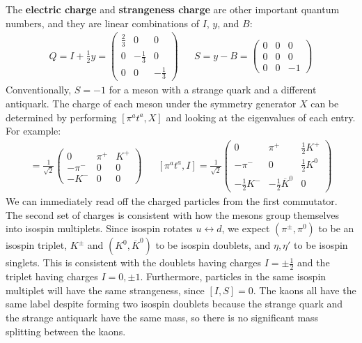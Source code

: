 \documentclass[11pt, oneside]{article}   	%
\theoremstyle{definition}
\numberwithin{equation}{subsection}		%
\begin{document}
The \textbf{electric charge} and \textbf{strangeness charge} are other important quantum numbers, and they are linear combinations 
of $I$, $y$, and $B$:
\begin{align}
	Q = I + \frac{1}{2} y = \begin{pmatrix} \frac{2}{3} & 0 & 0 \\ 0 & -\frac{1}{3} & 0 \\ 0 & 0 & -\frac{1}{3} \end{pmatrix} &&
	S = y - B = \begin{pmatrix} 0 & 0 & 0 \\ 0 & 0 & 0 \\ 0 & 0 & -1 \end{pmatrix}
\end{align}
Conventionally, $S = -1$ for a meson with a strange quark and a different antiquark. The charge of each meson under the symmetry 
generator $X$ can be determined by performing $[\pi^a t^a, X]$ and looking at the eigenvalues of each entry. For example:
\begin{align}
	[\pi^a t^a, Q] = \frac{1}{\sqrt 2} \begin{pmatrix} 0 & \pi^+ & K^+ \\ -\pi^- & 0 & 0 \\ -K^- & 0 & 0 \end{pmatrix} && 
	[\pi^a t^a, I] = \frac{1}{\sqrt 2} \begin{pmatrix} 0 & \pi^+ & \frac{1}{2} K^+ \\ -\pi^- & 0 & \frac{1}{2} K^0 \\ -\frac{1}{2} K^- & -\frac{1}{2} \overline{K}^0 & 0 \end{pmatrix}
\end{align}
We can immediately read off the charged particles from the first commutator. The second set of charges is consistent with how the mesons 
group themselves into isospin multiplets. Since isospin rotates $u\leftrightarrow d$, we expect $(\pi^\pm, \pi^0)$ to be an isospin triplet, 
$K^\pm$ and $(K^0, \overline K^0)$ to be isospin doublets, and $\eta, \eta'$ to be isospin singlets. This is consistent with the doublets 
having charges $I = \pm \frac{1}{2}$ and the triplet having charges $I = 0, \pm 1$. Furthermore, particles in the same isospin multiplet 
will have the same strangeness, since $[I, S] = 0$. The kaons all have the same label despite forming two isospin doublets because the strange quark 
and the strange antiquark have the same mass, so there is no significant mass splitting between the kaons. 
\end{document}
